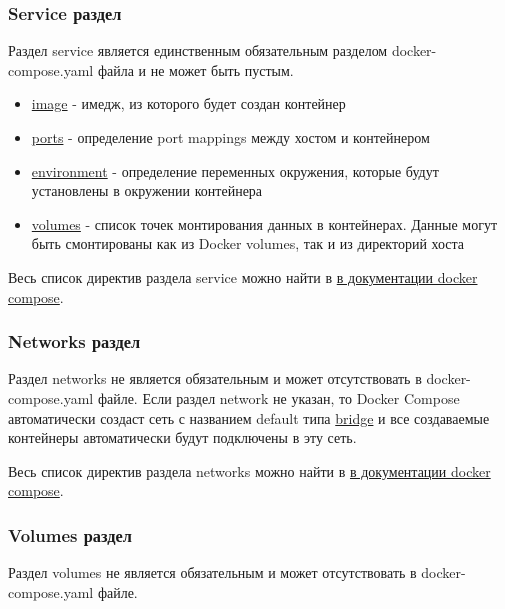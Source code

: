 \documentclass[12pt,a4paper]{article}
\begin{document}
    \subsubsection{Service раздел}
    Раздел service является единственным обязательным разделом docker-compose.yaml файла и не может быть пустым.

    \begin{itemize}
        \item \href{https://docs.docker.com/reference/compose-file/services/#image}{image} - имедж, из которого будет создан контейнер
        \item \href{https://docs.docker.com/reference/compose-file/services/#ports}{ports} - определение port mappings между хостом и контейнером
        \item \href{https://docs.docker.com/reference/compose-file/services/#environment}{environment} - определение переменных окружения, которые будут установлены в окружении контейнера
        \item \href{https://docs.docker.com/reference/compose-file/services/#volumes}{volumes} - список точек монтирования данных в контейнерах. Данные могут быть смонтированы как из Docker volumes, так и из директорий хоста
    \end{itemize}
    
    Весь список директив раздела service можно найти в \href{https://docs.docker.com/reference/compose-file/services/}{в документации docker compose}.

    \subsubsection{Networks раздел}
    Раздел networks не является обязательным и может отсутствовать в docker-compose.yaml файле. Если раздел network не указан, то
    Docker Compose автоматически создаст сеть с названием default типа \href{https://docs.docker.com/engine/network/drivers/}{bridge}
    и все создаваемые контейнеры автоматически будут подключены в эту сеть.

    Весь список директив раздела networks можно найти в \href{https://docs.docker.com/reference/compose-file/networks/#attributes}{в документации docker compose}.

    \subsubsection{Volumes раздел}
    Раздел volumes не является обязательным и может отсутствовать в docker-compose.yaml файле.
\end{document}
